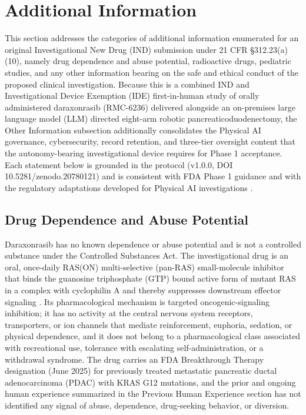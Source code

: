 \section{Additional Information}

This section addresses the categories of additional information enumerated for an
original Investigational New Drug (IND) submission under 21 CFR \S 312.23(a)(10),
namely drug dependence and abuse potential, radioactive drugs, pediatric studies,
and any other information bearing on the safe and ethical conduct of the proposed
clinical investigation. Because this is a combined IND and Investigational Device
Exemption (IDE) first-in-human study of orally administered daraxonrasib
(RMC-6236) delivered alongside an on-premises large language model (LLM) directed
eight-arm robotic pancreaticoduodenectomy, the Other Information subsection
additionally consolidates the Physical AI governance, cybersecurity, record
retention, and three-tier oversight content that the autonomy-bearing
investigational device requires for Phase 1 acceptance. Each statement below is
grounded in the protocol (v1.0.0, DOI 10.5281/zenodo.20780121) and is consistent
with FDA Phase 1 guidance \cite{phase1guidance} and with the regulatory adaptations
developed for Physical AI investigations \cite{cfr312paiuni,cfr050paiuni,ichpaistduni}.

\subsection{Drug Dependence and Abuse Potential}

Daraxonrasib has no known dependence or abuse potential and is not a controlled
substance under the Controlled Substances Act. The investigational drug is an oral,
once-daily RAS(ON) multi-selective (pan-RAS) small-molecule inhibitor that binds
the guanosine triphosphate (GTP) bound active form of mutant RAS in a complex with
cyclophilin A and thereby suppresses downstream effector signaling
\cite{daraxwhipple,onpremwhippl}. Its pharmacological mechanism is targeted
oncogenic-signaling inhibition; it has no activity at the central nervous system
receptors, transporters, or ion channels that mediate reinforcement, euphoria,
sedation, or physical dependence, and it does not belong to a pharmacological class
associated with recreational use, tolerance with escalating self-administration, or
a withdrawal syndrome. The drug carries an FDA Breakthrough Therapy designation
(June 2025) for previously treated metastatic pancreatic ductal adenocarcinoma
(PDAC) with KRAS G12 mutations, and the prior and ongoing human experience
summarized in the Previous Human Experience section has not identified any signal
of abuse, dependence, drug-seeking behavior, or diversion.

